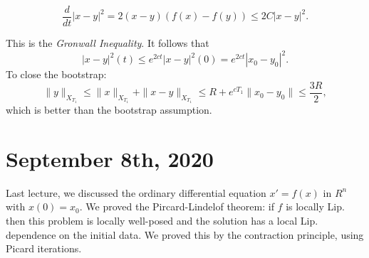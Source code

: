 \documentclass[11pt]{scrartcl}
\begin{document}
$$\frac{d}{dt}|x-y|^2 = 2(x-y)(f(x) - f(y)) \le 2C|x-y|^2.$$

This is the \textit{Gronwall Inequality}.  It follows that $$|x-y|^2(t) \le e^{2ct}|x-y|^2(0) = e^{2ct}|x_0 - y_0|^2.$$
To close the bootstrap:
$$\|y\|_{X_{T_1}} \le \|x\|_{X_{T_1}} + \|x-y\|_{X_{T_1}} \le R + e^{cT_1}\|x_0 - y_0\| \le \frac{3R}{2},$$
which is better than the bootstrap assumption.
\section{September 8th, 2020}
Last lecture, we discussed the ordinary differential equation $x' = f(x)$ in $R^n$ with $x(0) = x_0$.  
We proved the Pircard-Lindelof theorem: if $f$ is locally Lip. then this problem is locally well-posed and the solution has a local Lip. dependence on the initial data.  We proved this by the contraction principle, using Picard iterations.
\end{document}
